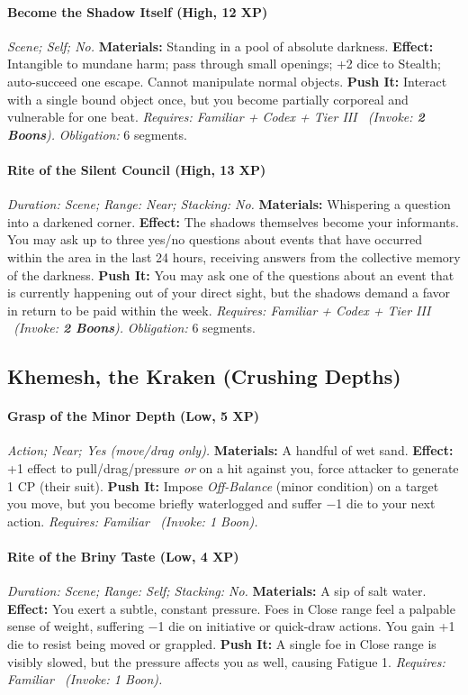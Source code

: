 \documentclass[12pt,twoside]{book}
\begin{document}
\paragraph{Become the Shadow Itself (High, 12 XP)} \emph{Scene; Self; No.}
\textbf{Materials:} Standing in a pool of absolute darkness.
\textbf{Effect:} Intangible to mundane harm; pass through small openings; +2 dice to Stealth; auto-succeed one escape. Cannot manipulate normal objects.
\textbf{Push It:} Interact with a single bound object once, but you become partially corporeal and vulnerable for one beat.
\emph{Requires: Familiar + Codex + Tier III \ (\textit{Invoke:} \textbf{2 Boons}).}
\emph{Obligation:} 6 segments.

\paragraph{Rite of the Silent Council (High, 13 XP)} \emph{Duration: Scene; Range: Near; Stacking: No.}
\textbf{Materials:} Whispering a question into a darkened corner.
\textbf{Effect:} The shadows themselves become your informants. You may ask up to three yes/no questions about events that have occurred within the area in the last 24 hours, receiving answers from the collective memory of the darkness.
\textbf{Push It:} You may ask one of the questions about an event that is currently happening out of your direct sight, but the shadows demand a favor in return to be paid within the week.
\emph{Requires: Familiar + Codex + Tier III \ (\textit{Invoke:} \textbf{2 Boons}).}
\emph{Obligation:} 6 segments.

\subsection{Khemesh, the Kraken (Crushing Depths)}
\paragraph{Grasp of the Minor Depth (Low, 5 XP)} \emph{Action; Near; Yes (move/drag only).}
\textbf{Materials:} A handful of wet sand.
\textbf{Effect:} +1 effect to pull/drag/pressure \emph{or} on a hit against you, force attacker to generate 1 CP (their suit).
\textbf{Push It:} Impose \emph{Off-Balance} (minor condition) on a target you move, but you become briefly waterlogged and suffer −1 die to your next action.
\emph{Requires: Familiar \ (\textit{Invoke:} 1 Boon).}
\paragraph{Rite of the Briny Taste (Low, 4 XP)} \emph{Duration: Scene; Range: Self; Stacking: No.}
\textbf{Materials:} A sip of salt water.
\textbf{Effect:} You exert a subtle, constant pressure. Foes in Close range feel a palpable sense of weight, suffering −1 die on initiative or quick-draw actions. You gain +1 die to resist being moved or grappled.
\textbf{Push It:} A single foe in Close range is visibly slowed, but the pressure affects you as well, causing Fatigue 1.
\emph{Requires: Familiar \ (\textit{Invoke:} 1 Boon).}
\end{document}
